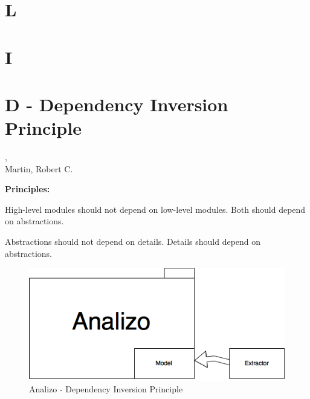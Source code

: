
\section{L} %
\label{sec:l}


\section{I} %
\label{sec:i}


\section{D - Dependency Inversion Principle} %
\label{sec:d}

\begin{frame}
    , \\Martin, Robert C.
\end{frame}

\begin{Parallel}[v]{5cm}{5cm}
    \textbf{Principles:}
    \ParallelLText%
    {

        High-level modules should not depend on low-level modules. Both should depend on abstractions.
    }
    \ParallelRText%
    {

        Abstractions should not depend on details. Details should depend on abstractions.
    }
\end{Parallel}  

\begin{figure}[!htb]
    \centering
    \includegraphics[scale=0.5]{SOLID-D}
    \caption{Analizo - Dependency Inversion Principle}
\end{figure}

